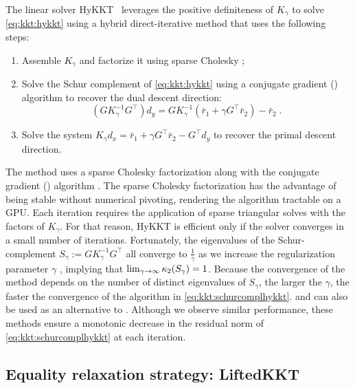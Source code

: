 The linear solver HyKKT~\cite{regev2023hykkt}
leverages the positive definiteness of $K_\gamma$ to solve
\eqref{eq:kkt:hykkt} using a hybrid direct-iterative method
that uses the following steps:
\begin{enumerate}
  \item Assemble $K_\gamma$ and factorize it using sparse Cholesky ;
  \item Solve the Schur complement of \eqref{eq:kkt:hykkt} using a conjugate gradient (\CG)
    algorithm to recover the dual descent direction:
    \begin{equation}
      \label{eq:kkt:schurcomplhykkt}
      (G K_\gamma^{-1} G^\top) d_y = G K_\gamma^{-1} (\bar{r}_1 + \gamma G^\top \bar{r}_2) - \bar{r}_2 \; .
    \end{equation}
  \item Solve the system $K_\gamma d_x = \bar{r}_1 + \gamma G^\top \bar{r}_2 - G^\top d_y$
    to recover the primal descent direction.
\end{enumerate}
The method uses a sparse Cholesky factorization along with the conjugate gradient (\CG) algorithm \cite{hestenes-stiefel-1952}.
The sparse Cholesky factorization has the advantage of being stable without
numerical pivoting, rendering the algorithm tractable on a GPU.
Each \CG iteration requires the application of sparse triangular solves with the
factors of $K_\gamma$. For that reason,
HyKKT is efficient only if the \CG solver converges in a small number of iterations.
Fortunately, the eigenvalues of the Schur-complement $S_\gamma := G K_\gamma^{-1} G^\top$
all converge to $\frac{1}{\gamma}$ as we increase the regularization parameter
$\gamma$ \cite[Theorem 4]{regev2023hykkt}, implying that $\lim_{\gamma \to \infty} \kappa_2(S_\gamma) = 1$.
Because the convergence of the \CG method depends on the number of distinct eigenvalues of $S_{\gamma}$,
the larger the $\gamma$, the faster the convergence of
the \CG algorithm in \eqref{eq:kkt:schurcomplhykkt}.
\CR \cite{hestenes-stiefel-1952} and \CAR \cite{montoison-orban-saunders-2023} can also be used as an alternative to \CG.
Although we observe similar performance, these methods ensure a monotonic decrease in the residual norm of \eqref{eq:kkt:schurcomplhykkt} at each iteration.

\subsection{Equality relaxation strategy: LiftedKKT}
\label{sec:kkt:sckkt}


